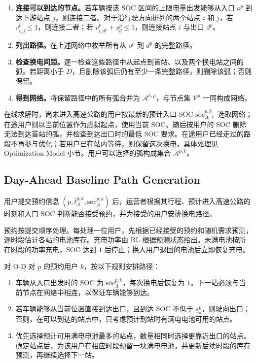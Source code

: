 \documentclass[12pt,a4paper,UTF8]{ctexart}
\begin{document}
\begin{enumerate}
  \item[\textbf{Step 1.}] \textbf{连接可以到达的节点。}若车辆按该 SOC 区间的上限电量出发能够从入口 $o^p$ 到达下游站点 $j$，则连接二者。对于沿行驶方向排列的两个站点 $i$ 和 $j$，若 $v_{i,j}^p\le1$，则连接二者；若 $v_{i,d^p}^p+\underline s_d^p\le1$，则连接站点 $i$ 与出口 $d^p$。

  \item[\textbf{Step 2.}] \textbf{列出路径。}在上述网络中枚举所有从 $o^p$ 到 $d^p$ 的完整路径。

  \item[\textbf{Step 3.}] \textbf{检查换电间距。}逐一检查这些路径中从起点到首站、以及两个换电站之间的弧。若距离小于 $\underline D$，且删除该弧后仍有至少一条完整路径，则删除该弧；否则保留。

  \item[\textbf{Step 4.}] \textbf{得到网络。}将保留路径中的所有弧合并为 $\mathcal A^{h,p}$，与节点集 $\mathcal V^p$ 一同构成网络。
\end{enumerate}

在线求解时，尚未进入高速公路的用户按最新的预计入口 SOC $\widetilde{\mathrm{soc}}_{A,\ell}^{p,k}$ 选取网络；在途用户则以当前位置作为虚拟起点，使用当前 SOC。随后按用户的 SOC 删除无法到达首站的弧，并检查到达出口时的最低 SOC 要求。在途用户已经走过的路段不再参与优化；若用户已在站内等待，则保留这次换电，具体处理见 Optimization Model 小节。用户可以选择的弧构成集合 $\mathcal A^{p,k}$。


\subsection{Day-Ahead Baseline Path Generation}

用户提交预约信息
$\left(p,\bar t_A^{p,k},\overline{\mathrm{soc}}_A^{p,k}\right)$
后，运营者根据其行程、预计进入高速公路的时刻和入口 SOC 判断能否接受预约，并为接受的用户安排换电路径。

预约按提交顺序处理。每处理一位用户，先根据已经接受的预约和随机需求预测，逐时段估计各站的电池库存。充电功率由 RL 根据预测状态给出。未满电池按所在时段的功率充电，SOC 达到 $1$ 后停止；换入用户退回的电池后立即恢复充电。

对 O-D 对 $p$ 的预约用户 $k$，按以下规则安排路径：
\begin{enumerate}
  \item 车辆从入口出发时的 SOC 为 $\overline{\mathrm{soc}}_A^{p,k}$，每次换电后恢复为 $1$。下一站必须与当前节点在网络中相连，以保证车辆能够到达。
  \item 若车辆能够从当前位置直接到达出口，且到达 SOC 不低于 $\underline s_d^p$，则驶向出口；否则，在可以到达的站点中，只考虑预计到站时有满电电池可用的站点。
  \item 优先选择预计可用满电电池最多的站点，数量相同时选择更靠近出口的站点。确定站点后，为该用户在相应时段预留一块满电电池，并更新后续时段的库存预测，再继续选择下一站。
\end{enumerate}
\end{document}
